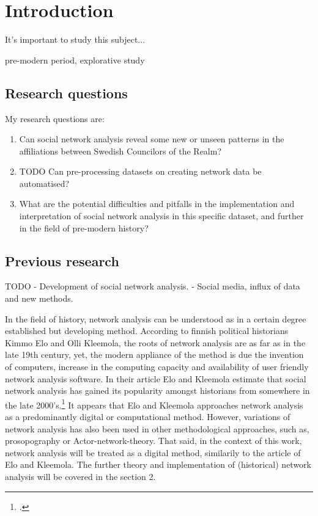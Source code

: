 \documentclass[a4paper,12pt]{article}
\begin{document}
\section{Introduction}

It's important to study this subject...

pre-modern period, explorative study

\subsection{Research questions}

My research questions are:
\begin{enumerate}
	\item Can social network analysis reveal some new or unseen patterns in the affiliations between Swedish Councilors of the Realm?
	\item TODO Can pre-processing datasets on creating network data be automatised?
	\item What are the potential difficulties and pitfalls in the implementation and interpretation of social network analysis in this specific dataset, and further in the field of pre-modern history?
\end{enumerate} 

\subsection{Previous research}
TODO
- Development of social network analysis. 
- Social media, influx of data and new methods.

In the field of history, network analysis can be understood as in a certain degree established but developing method. According to finnish political historians Kimmo Elo and Olli Kleemola, the roots of network analysis are as far as in the late 19th century, yet, the modern appliance of the method is due the invention of computers, increase in the computing capacity and availability of user friendly network analysis software. In their article Elo and Kleemola estimate that social network analysis has gained its popularity amongst historians from somewhere in the late 2000's.\footcite[p. 415-417.]{eloAklee15} It appears that Elo and Kleemola approaches network analysis as a predominantly digital or computational method. However, variations of network analysis has also been used in other methodological approaches, such as, prosopography or Actor-network-theory. That said, in the context of this work, network analysis will be treated as a digital method, similarily to the article of Elo and Kleemola. The further theory and implementation of (historical) network analysis will be covered in the section 2.
\end{document}
